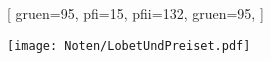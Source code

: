 [
    gruen={95}, 
    pfi={15}, 
    pfii={132},
    gruen={95}, 
]

\texttt{[image: Noten/LobetUndPreiset.pdf]}

\endsong
